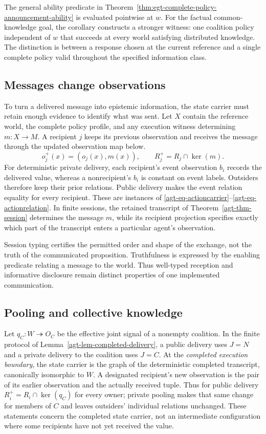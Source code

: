 \documentclass[11pt,a4paper]{article}
\numberwithin{equation}{section}
\theoremstyle{definition}
\theoremstyle{remark}
\theoremstyle{plain}
\providecommand{\kerpair}{\mathop{\mathrm{ker}}}
\begin{document}
The general ability predicate in
Theorem~\ref{thm:egt-complete-policy-announcement-ability} is evaluated
pointwise at $w$. For the factual common-knowledge goal, the corollary
constructs a stronger witness: one coalition policy independent of $w$
that succeeds at every world satisfying distributed knowledge.
The distinction is between a response chosen at the current reference
and a single complete policy valid throughout the specified information
class.

\subsection{Messages change observations}

To turn a delivered message into epistemic information, the state
carrier must retain enough evidence to identify what was sent.
Let $X$ contain the reference world, the complete policy profile, and
any execution witness determining $m:X\to M$. A recipient $j$
keeps its previous observation and receives the message through the
updated observation map below.
\[
 o_j^+(x)=(o_j(x),m(x)),\qquad
 R_j^+=R_j\cap\kerpair(m).
\]
For deterministic private delivery, each recipient's event
observation $b_i$ records the delivered value, whereas a nonrecipient's
$b_i$ is constant on event labels. Outsiders therefore keep their prior
relations. Public delivery makes the event relation equality for every
recipient. These are instances of
\eqref{agt-eq-actioncarrier}--\eqref{agt-eq-actionrelation}.
In finite sessions, the retained transcript of
Theorem~\ref{agt-thm-session} determines the message $m$, while its
recipient projection specifies exactly which part of the transcript
enters a particular agent's observation.

Session typing certifies the permitted order and shape of the
exchange, not the truth of the communicated proposition. Truthfulness
is expressed by the enabling predicate relating a message to the world.
Thus well-typed reception and informative disclosure remain distinct
properties of one implemented communication.

\subsection{Pooling and collective knowledge}

Let $q_C:W\twoheadrightarrow O_C$ be the effective joint signal of a
nonempty coalition. In the finite protocol of
Lemma~\ref{agt-lem-completed-delivery}, a public delivery uses $J=N$
and a private delivery to the coalition uses $J=C$. At the \emph{completed
execution boundary}, the state carrier is the graph of the deterministic
completed transcript, canonically isomorphic to $W$. A designated
recipient's new observation is the pair of its earlier observation and
the actually received tuple. Thus for public delivery
$R_i^+=R_i\cap\kerpair(q_C)$ for every owner; private pooling makes
that same change for members of $C$ and leaves outsiders' individual
relations unchanged. These statements concern the completed state
carrier, not an intermediate configuration where some recipients have
not yet received the value.
\end{document}
